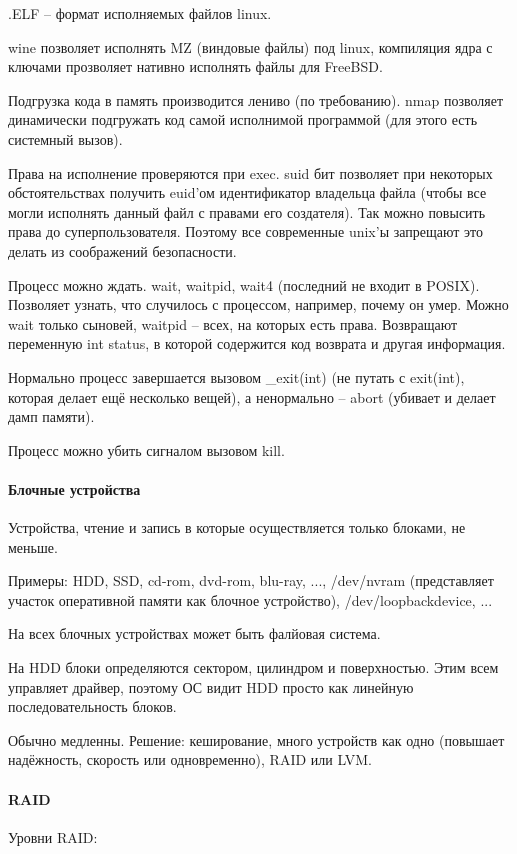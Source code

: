 \documentclass[a4paper,10pt]{article}
\begin{document}
.ELF -- формат исполняемых файлов linux.

wine позволяет исполнять MZ (виндовые файлы) под linux, компиляция ядра с ключами прозволяет нативно исполнять файлы для FreeBSD. 

Подгрузка кода в память производится лениво (по требованию). nmap позволяет динамически подгружать код самой исполнимой программой (для этого есть системный вызов). 

Права на исполнение проверяются при exec. suid бит позволяет при некоторых обстоятельствах получить euid'ом идентификатор владельца файла (чтобы все могли исполнять данный файл с правами его создателя). Так можно повысить права до суперпользователя. Поэтому все современные unix'ы запрещают это делать из соображений безопасности. 


Процесс можно ждать. wait, waitpid, wait4 (последний не входит в POSIX). Позволяет узнать, что случилось с процессом, например, почему он умер. Можно wait только сыновей, waitpid -- всех, на которых есть права. Возвращают переменную int status, в которой содержится код возврата и другая информация.

Нормально процесс завершается вызовом \_exit(int) (не путать с exit(int), которая делает ещё несколько вещей), а ненормально -- abort (убивает и делает дамп памяти).

Процесс можно убить сигналом вызовом kill.

\paragraph{Блочные устройства}
Устройства, чтение и запись в которые осуществляется только блоками, не меньше.

Примеры: HDD, SSD, cd-rom, dvd-rom, blu-ray, ..., /dev/nvram (представляет участок оперативной памяти как блочное устройство), /dev/loopbackdevice, ...

На всех блочных устройствах может быть фалйовая система.

На HDD блоки определяются сектором, цилиндром и поверхностью. Этим всем управляет драйвер, поэтому ОС видит HDD просто как линейную последовательность блоков.

Обычно медленны. Решение: 
кеширование, 
много устройств как одно (повышает надёжность, скорость или одновременно),
RAID или LVM.
\paragraph{RAID}
Уровни RAID:
\end{document}

